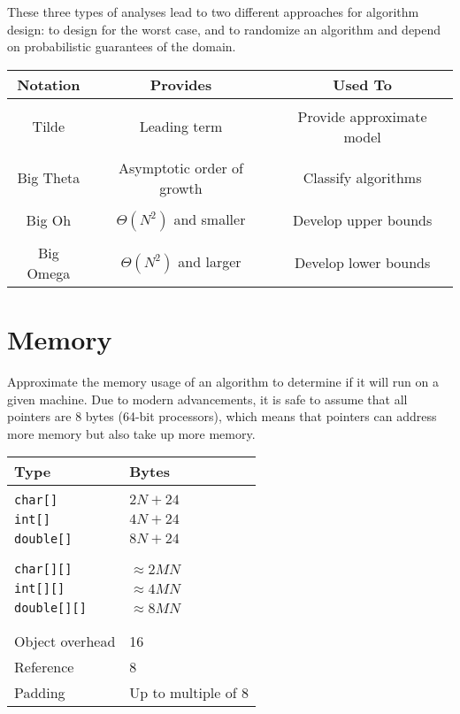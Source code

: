 \documentclass[11pt]{article}
\begin{document}
	These three types of analyses lead to two different approaches for algorithm design: to design for the worst case, and to randomize an algorithm and depend on probabilistic guarantees of the domain.
	
	\begin{center}
	\begin{tabular}[t]{ccc}
	Notation	&	Provides	&	Used To\\\hline
	\\Tilde		&	Leading term	&	Provide approximate model\\\\
	Big Theta	&	Asymptotic order of growth	&	Classify algorithms\\\\
	Big Oh		&	$\Theta (N^2)$ and smaller	&	Develop upper bounds\\\\
	Big Omega	&	$\Theta (N^2)$ and larger	&	Develop lower bounds
	\end{tabular}
	\end{center}
	
\section{Memory}
	Approximate the memory usage of an algorithm to determine if it will run on a given machine. Due to modern advancements, it is safe to assume that all pointers are 8 bytes (64-bit processors), which means that pointers can address more memory but also take up more memory.
	
	\begin{center}
	\begin{tabular}[t]{l l}
	\textbf{Type}	&	\textbf{Bytes}	\\\hline
	\\\verb|char[]|	&	$2N + 24$\\
	\verb|int[]|	&	$4N + 24$\\
	\verb|double[]|	&	$8N + 24$\\\\\hline
	\\\verb|char[][]|	&	$\approx 2MN$\\
	\verb|int[][]|	&	$\approx 4MN$\\
	\verb|double[][]|	&	$\approx 8MN$\\\\\hline
	\\Object overhead	&	16\\
	Reference		&	8\\
	Padding			&	Up to multiple of 8
	\end{tabular}
	\end{center}
	
	\def\enotesize{\normalsize}
	\theendnotes
\end{document}
